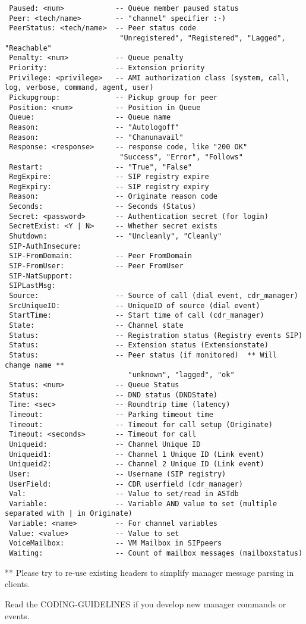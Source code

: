 \begin{verbatim}
 Paused: <num>            -- Queue member paused status
 Peer: <tech/name>        -- "channel" specifier :-)
 PeerStatus: <tech/name>  -- Peer status code
                           "Unregistered", "Registered", "Lagged", "Reachable"
 Penalty: <num>           -- Queue penalty
 Priority:                -- Extension priority
 Privilege: <privilege>   -- AMI authorization class (system, call, log, verbose, command, agent, user)
 Pickupgroup:             -- Pickup group for peer
 Position: <num>          -- Position in Queue
 Queue:                   -- Queue name
 Reason:                  -- "Autologoff"
 Reason:                  -- "Chanunavail"
 Response: <response>     -- response code, like "200 OK"
                           "Success", "Error", "Follows"
 Restart:                 -- "True", "False"
 RegExpire:               -- SIP registry expire
 RegExpiry:               -- SIP registry expiry
 Reason:                  -- Originate reason code
 Seconds:                 -- Seconds (Status)
 Secret: <password>       -- Authentication secret (for login)
 SecretExist: <Y | N>     -- Whether secret exists
 Shutdown:                -- "Uncleanly", "Cleanly"
 SIP-AuthInsecure:
 SIP-FromDomain:          -- Peer FromDomain
 SIP-FromUser:            -- Peer FromUser
 SIP-NatSupport:
 SIPLastMsg:
 Source:                  -- Source of call (dial event, cdr_manager)
 SrcUniqueID:             -- UniqueID of source (dial event)
 StartTime:               -- Start time of call (cdr_manager)
 State:                   -- Channel state
 Status:                  -- Registration status (Registry events SIP)
 Status:                  -- Extension status (Extensionstate)
 Status:                  -- Peer status (if monitored)  ** Will change name **
                             "unknown", "lagged", "ok"
 Status: <num>            -- Queue Status
 Status:                  -- DND status (DNDState)
 Time: <sec>              -- Roundtrip time (latency)
 Timeout:                 -- Parking timeout time
 Timeout:                 -- Timeout for call setup (Originate)
 Timeout: <seconds>       -- Timeout for call
 Uniqueid:                -- Channel Unique ID
 Uniqueid1:               -- Channel 1 Unique ID (Link event)
 Uniqueid2:               -- Channel 2 Unique ID (Link event)
 User:                    -- Username (SIP registry)
 UserField:               -- CDR userfield (cdr_manager)
 Val:                     -- Value to set/read in ASTdb
 Variable:                -- Variable AND value to set (multiple separated with | in Originate)
 Variable: <name>         -- For channel variables
 Value: <value>           -- Value to set
 VoiceMailbox:            -- VM Mailbox in SIPpeers
 Waiting:                 -- Count of mailbox messages (mailboxstatus)
\end{verbatim}

 ** Please try to re-use existing headers to simplify manager message parsing in clients.

Read the CODING-GUIDELINES if you develop new manager commands or events.
